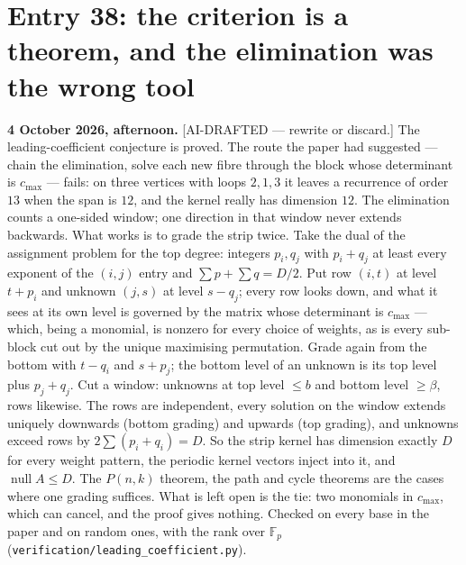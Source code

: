 \documentclass[12pt]{article}
\begin{document}
\section*{Entry 38: the criterion is a theorem, and the elimination was the wrong tool}

\textbf{4 October 2026, afternoon.} [AI-DRAFTED --- rewrite or discard.] The
leading-coefficient conjecture is proved. The route the paper had suggested
--- chain the elimination, solve each new fibre through the block whose
determinant is $c_{\max}$ --- fails: on three vertices with loops $2,1,3$ it
leaves a recurrence of order $13$ when the span is $12$, and the kernel really
has dimension $12$. The elimination counts a one-sided window; one direction in
that window never extends backwards. What works is to grade the strip twice.
Take the dual of the assignment problem for the top degree: integers $p_i,q_j$
with $p_i+q_j$ at least every exponent of the $(i,j)$ entry and
$\sum p+\sum q=D/2$. Put row $(i,t)$ at level $t+p_i$ and unknown $(j,s)$ at
level $s-q_j$; every row looks down, and what it sees at its own level is
governed by the matrix whose determinant is $c_{\max}$ --- which, being a
monomial, is nonzero for every choice of weights, as is every sub-block cut
out by the unique maximising permutation. Grade again from the bottom with
$t-q_i$ and $s+p_j$; the bottom level of an unknown is its top level plus
$p_j+q_j$. Cut a window: unknowns at top level $\le b$ and bottom level
$\ge\beta$, rows likewise. The rows are independent, every solution on the
window extends uniquely downwards (bottom grading) and upwards (top grading),
and unknowns exceed rows by $2\sum(p_i+q_i)=D$. So the strip kernel has
dimension exactly $D$ for every weight pattern, the periodic kernel vectors
inject into it, and $\operatorname{null}A\le D$. The $P(n,k)$ theorem, the
path and cycle theorems are the cases where one grading suffices. What is left
open is the tie: two monomials in $c_{\max}$, which can cancel, and the proof
gives nothing. Checked on every base in the paper and on random ones, with the
rank over $\mathbb F_p$ (\texttt{verification/leading\_coefficient.py}).
\end{document}
